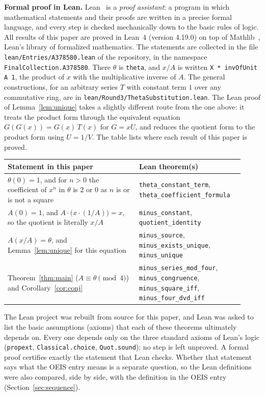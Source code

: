 \documentclass[11pt,a4paper]{article}
\theoremstyle{definition}
\theoremstyle{remark}
\newcommand{\para}[1]{\par\medskip\noindent\textbf{#1}\enspace}
\begin{document}
\para{Formal proof in Lean.}
Lean~\cite{lean} is a \emph{proof assistant}: a program in which mathematical statements and their proofs are written
in a precise formal language, and every step is checked mechanically down to the basic rules of logic. All results of
this paper are proved in Lean~4 (version 4.19.0) on top of Mathlib~\cite{mathlib}, Lean's library of formalized
mathematics. The statements are collected in the file \texttt{lean/Entries/A378580.lean} of the repository,
in the namespace \texttt{FinalCollection.A378580}. There $\theta$ is \texttt{theta}, and $x/A$ is written \texttt{X * invOfUnit A 1}, the product of
$x$ with the multiplicative inverse of $A$. The general constructions, for an arbitrary series $T$ with constant term $1$
over any commutative ring, are in \texttt{lean/Round3/ThetaSubstitution.lean}. The Lean proof of Lemma~\ref{lem:unique}
takes a slightly different route from the one above: it treats the product form through the equivalent equation
$G(G(x))=G(x)\,T(x)$ for $G=xU$, and reduces the quotient form to the product form using $U=1/V$.
The table lists where each result of this paper is proved.
\begin{center}\small\renewcommand{\arraystretch}{1.25}
\begin{tabular}{>{\raggedright\arraybackslash}p{0.52\linewidth}>{\raggedright\arraybackslash}p{0.4\linewidth}}
\toprule
Statement in this paper & Lean theorem(s)\\
\midrule
$\theta(0)=1$, and for $n>0$ the coefficient of $x^n$ in $\theta$ is $2$ or $0$ as $n$ is or is not a square & \texttt{theta\_\allowbreak{}constant\_\allowbreak{}term}, \texttt{theta\_\allowbreak{}coefficient\_\allowbreak{}formula} \\
$A(0)=1$, and $A\cdot\bigl(x\cdot(1/A)\bigr)=x$, so the quotient is literally $x/A$ & \texttt{minus\_\allowbreak{}constant}, \texttt{quotient\_\allowbreak{}identity} \\
$A(x/A)=\theta$, and Lemma~\ref{lem:unique} for this equation & \texttt{minus\_\allowbreak{}source}, \texttt{minus\_\allowbreak{}exists\_\allowbreak{}unique}, \texttt{minus\_\allowbreak{}unique} \\
Theorem~\ref{thm:main} ($A\equiv\theta\pmod 4$) and Corollary~\ref{cor:conj} & \texttt{minus\_\allowbreak{}series\_\allowbreak{}mod\_\allowbreak{}four}, \texttt{minus\_\allowbreak{}congruence}, \texttt{minus\_\allowbreak{}square\_\allowbreak{}iff}, \texttt{minus\_\allowbreak{}four\_\allowbreak{}dvd\_\allowbreak{}iff} \\
\bottomrule
\end{tabular}
\end{center}
The Lean project was rebuilt from source for this paper, and Lean was asked to list the basic assumptions (axioms)
that each of these theorems ultimately depends on. Every one depends only on the three standard axioms of Lean's logic
(\texttt{propext}, \texttt{Classical.choice}, \texttt{Quot.sound}); no step is left unproved. A formal proof certifies
exactly the statement that Lean checks. Whether that statement says what the OEIS entry means is a separate question,
so the Lean definitions were also compared, side by side, with the definition in the OEIS entry
(Section~\ref{sec:sequence}).
\end{document}
